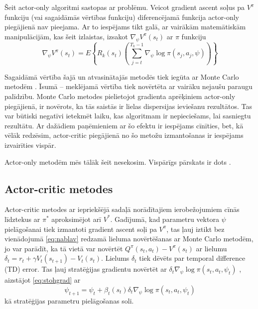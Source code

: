 \documentclass{ludis} %
\begin{document}
Šeit actor-only algoritmi sastopas ar problēmu. Veicot gradient ascent soļus pa $V^\pi$ funkciju (vai sagaidāmās vērtības funkciju) diferencējamā funkcija actor-only piegājienā nav pieejama.
Ar to iespējams tikt galā, ar vairākām matemātiskām manipulācijām, kas šeit izlaistas, izsakot $\nabla_\psi V^\pi(s_t)$ ar $\pi$ funkciju
\begin{equation} \label{eq:nablav}
	\nabla_\psi V^\pi(s_t) = E \left\{R_k(s_t) \left(\sum\limits_{j=t}^{T_k - 1} \nabla_\psi \log \pi(s_j, a_j, \psi) \right) \right\}
\end{equation}

Sagaidāmā vērtība šajā un atvasinātajās metodēs tiek iegūta ar Monte Carlo metodēm \autocite{halton1970retrospective}.
Īsumā -- meklējamā vērtība tiek novērtēta ar vairāku nejaušu paraugu palīdzību.
Monte Carlo metodes pielietojot gradienta aprēķiniem actor-only piegājienā, ir novērots, ka tās saistās ir lielas dispersijas ieviešanu rezultātos.
Tas var būtiski negatīvi ietekmēt laiku, kas algoritmam ir nepieciešams, lai sasniegtu rezultātu.
Ar dažādiem paņēmieniem ar šo efektu ir iespējams cīnīties, bet, kā vēlāk redzēsim, actor-critic piegājienā no šo metožu izmantošanas ir iespējams izvairīties vispār. %

Actor-only metodēm mēs tālāk šeit nesekosim.
Vispārīgs pārskats ir dots \autocite{Hasselt2012}.
 
\subsection{Actor-critic metodes}
Actor-critic metodes ar iepriekšējā sadaļā norādītajiem ierobežojumiem cīnās līdztekus ar $\pi^*$ aproksimējot arī $V^*$.
Gadījumā, kad parametru vektora $\psi$ pielāgošanai tiek izmantoti gradient ascent soļi pa $V^\pi$, tas ļauj iztikt bez vienādojumā \eqref{eq:nablav} redzamā lieluma novērtēšanas ar Monte Carlo metodēm, jo var parādīt, ka tā vietā var novērtēt $Q^\pi(s_t, a_t) - V^\pi(s_t)$ ar lielumu $\delta_t = r_{t} + \gamma V_t(s_{t+1}) - V_t(s_t)$.
Lielums $\delta_t$ tiek dēvēts par temporal difference (TD) error.
Tas ļauj stratēģijas gradientu novērtēt ar $\delta_t \nabla_\psi \log \pi(s_t,a_t,\psi_t)$ \autocite{sutton2000policy}, aizstājot \eqref{eq:stohgrad} ar
\begin{equation} \label{eq:psi}
	\psi_{t+1} = \psi_t + \beta_t(s_t) \delta_t \nabla_\psi \log \pi(s_t,a_t,\psi_t)
\end{equation}
kā stratēģijas parametru pielāgošanas soli.
\end{document}
